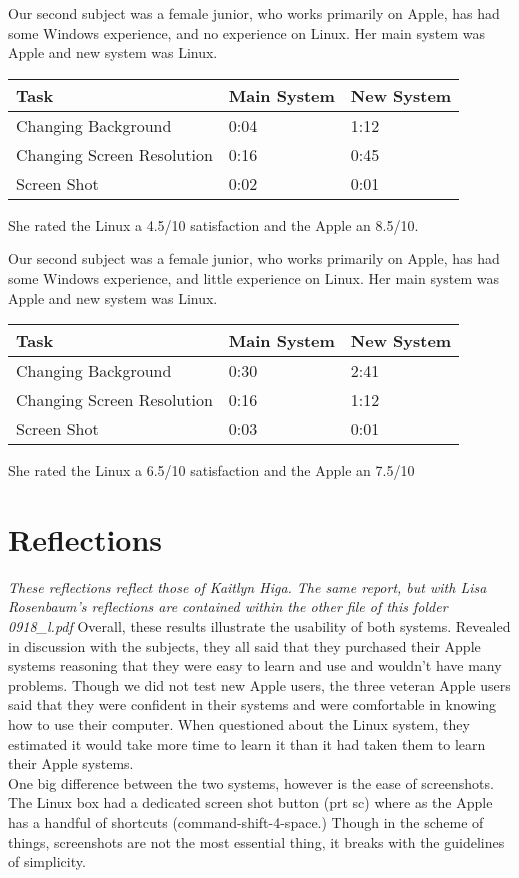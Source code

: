 \documentclass[12pt, onesided, letterpaper]{report}
\begin{document}
Our second subject was a female junior, who works primarily on Apple, has had some Windows experience, and no experience on Linux.  Her main system was Apple and new system was Linux.
\begin{center}
    \begin{tabular}{ | l | l | l |}
    \hline
    Task &Main System & New System  \\ \hline
    Changing Background & 0:04 & 1:12  \\ \hline
    Changing Screen Resolution & 0:16 & 0:45  \\ \hline
    Screen Shot & 0:02 & 0:01 \\
    \hline
    \end{tabular}
\end{center}
She rated the Linux a 4.5/10 satisfaction and the Apple an 8.5/10.

Our second subject was a female junior, who works primarily on Apple, has had some Windows experience, and little experience on Linux. Her main system was Apple and new system was Linux.
\begin{center}
    \begin{tabular}{ | l | l | l |}
    \hline
    Task &Main System & New System  \\ \hline
    Changing Background & 0:30 & 2:41  \\ \hline
    Changing Screen Resolution & 0:16 & 1:12  \\ \hline
    Screen Shot & 0:03 & 0:01 \\
    \hline
    \end{tabular}
\end{center}
She rated the Linux a 6.5/10 satisfaction and the Apple an 7.5/10
\pagebreak
\section*{Reflections}
\textit{These reflections reflect those of Kaitlyn Higa.  The same report, but with Lisa Rosenbaum's reflections are contained within the other file of this folder 0918_l.pdf}
Overall, these results illustrate the usability of both systems.  Revealed in discussion with the subjects, they all said that they purchased their Apple systems reasoning that they were easy to learn and use and wouldn't have many problems.  Though we did not test new Apple users, the three veteran Apple users said that they were confident in their systems and were comfortable in knowing how to use their computer. When questioned about the Linux system, they estimated it would take more time to learn it than it had taken them to learn their Apple systems. \\
One big difference between the two systems, however is the ease of screenshots.  The Linux box had a dedicated screen shot button (prt sc) where as the Apple has a handful of shortcuts (command-shift-4-space.)  Though in the scheme of things, screenshots are not the most essential thing, it breaks with the guidelines of simplicity.  \\
\end{document}
